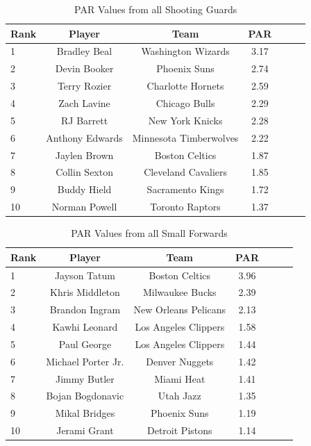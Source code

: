 \documentclass[12pt]{article}
\begin{document}
\begin{table}[H]
  \caption{PAR Values from all Shooting Guards}
  \label{tab:SGtable}
\centering
\begin{tabular}[t]{lcccccc}
  \toprule
  Rank & Player & Team & PAR\\
  \midrule
 1 & Bradley Beal & Washington Wizards & 3.17\\
 2 & Devin Booker & Phoenix Suns & 2.74\\
 3 & Terry Rozier & Charlotte Hornets & 2.59\\
 4 & Zach Lavine & Chicago Bulls & 2.29\\
 5 & RJ Barrett & New York Knicks & 2.28\\
 6 & Anthony Edwards & Minnesota Timberwolves & 2.22\\
 7 & Jaylen Brown & Boston Celtics & 1.87\\
 8 & Collin Sexton & Cleveland Cavaliers & 1.85\\
 9 & Buddy Hield & Sacramento Kings & 1.72\\
 10 & Norman Powell & Toronto Raptors & 1.37\\
  \bottomrule
\end{tabular}
\end{table}

\begin{table}[H]
  \caption{PAR Values from all Small Forwards}
  \label{tab:SFtable}
\centering
\begin{tabular}[t]{lcccccc}
  \toprule
  Rank & Player & Team & PAR\\
  \midrule
 1 & Jayson Tatum & Boston Celtics & 3.96\\
 2 & Khris Middleton & Milwaukee Bucks & 2.39\\
 3 & Brandon Ingram & New Orleans Pelicans & 2.13\\
 4 & Kawhi Leonard & Los Angeles Clippers & 1.58\\
 5 & Paul George & Los Angeles Clippers & 1.44\\
 6 & Michael Porter Jr. & Denver Nuggets & 1.42\\
 7 & Jimmy Butler & Miami Heat & 1.41\\
 8 & Bojan Bogdonavic & Utah Jazz & 1.35\\
 9 & Mikal Bridges & Phoenix Suns & 1.19\\
 10 & Jerami Grant & Detroit Pistons & 1.14\\
  \bottomrule
\end{tabular}
\end{table}
\end{document}
